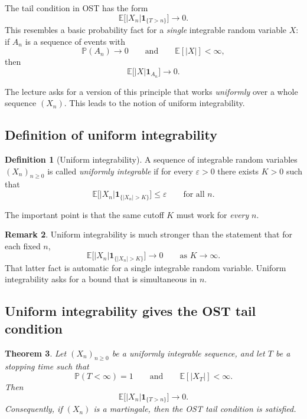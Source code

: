 \documentclass[11pt]{article}
\newtheorem{theorem}{Theorem}[section]
\theoremstyle{definition}
\newtheorem{definition}[theorem]{Definition}
\newtheorem{remark}[theorem]{Remark}
\begin{document}
The tail condition in OST has the form
\[
\mathbb E\bigl[|X_n|\mathbf 1_{\{T>n\}}\bigr]\to 0.
\]
This resembles a basic probability fact for a \emph{single} integrable random variable \(X\): if \(A_n\) is a sequence of events with
\[
\mathbb P(A_n)\to 0
\qquad \text{and} \qquad
\mathbb E[|X|]<\infty,
\]
then
\[
\mathbb E\bigl[|X|\mathbf 1_{A_n}\bigr]\to 0.
\]

The lecture asks for a version of this principle that works \emph{uniformly} over a whole sequence \((X_n)\). This leads to the notion of uniform integrability.

\subsection{Definition of uniform integrability}

\begin{definition}[Uniform integrability]
A sequence of integrable random variables \((X_n)_{n\ge 0}\) is called \emph{uniformly integrable} if for every \(\varepsilon>0\) there exists \(K>0\) such that
\[
\mathbb E\bigl[|X_n|\mathbf 1_{\{|X_n|>K\}}\bigr]\le \varepsilon
\qquad \text{for all } n.
\]
\end{definition}

The important point is that the same cutoff \(K\) must work for \emph{every} \(n\).

\begin{remark}
Uniform integrability is much stronger than the statement that for each fixed \(n\),
\[
\mathbb E\bigl[|X_n|\mathbf 1_{\{|X_n|>K\}}\bigr]\to 0
\qquad \text{as } K\to\infty.
\]
That latter fact is automatic for a single integrable random variable. Uniform integrability asks for a bound that is simultaneous in \(n\).
\end{remark}

\subsection{Uniform integrability gives the OST tail condition}

\begin{theorem}
Let \((X_n)_{n\ge 0}\) be a uniformly integrable sequence, and let \(T\) be a stopping time such that
\[
\mathbb P(T<\infty)=1
\qquad \text{and} \qquad
\mathbb E[|X_T|]<\infty.
\]
Then
\[
\mathbb E\bigl[|X_n|\mathbf 1_{\{T>n\}}\bigr]\to 0.
\]
Consequently, if \((X_n)\) is a martingale, then the OST tail condition is satisfied.
\end{theorem}
\end{document}
